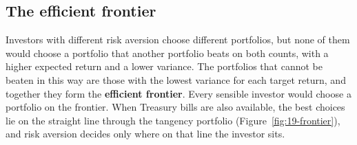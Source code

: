 \subsection{The efficient frontier}
\label{sec:19-frontier}

Investors with different risk aversion choose different portfolios, but none of them would choose a portfolio that another portfolio beats on both counts, with a higher expected return and a lower variance. The portfolios that cannot be beaten in this way are those with the lowest variance for each target return, and together they form the \textbf{efficient frontier}. Every sensible investor would choose a portfolio on the frontier. When Treasury bills are also available, the best choices lie on the straight line through the tangency portfolio (Figure~\ref{fig:19-frontier}), and risk aversion decides only where on that line the investor sits.


